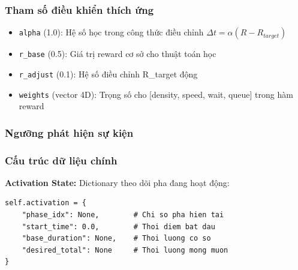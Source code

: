 \documentclass[12pt,a4paper,oneside]{report}
\begin{document}
\subsubsection{Tham số điều khiển thích ứng}
\begin{itemize}
    \item \texttt{alpha} (1.0): Hệ số học trong công thức điều chỉnh $\Delta t = \alpha(R - R_{target})$
    \item \texttt{r\_base} (0.5): Giá trị reward cơ sở cho thuật toán học
    \item \texttt{r\_adjust} (0.1): Hệ số điều chỉnh R\_target động
    \item \texttt{weights} (vector 4D): Trọng số cho [density, speed, wait, queue] trong hàm reward
\end{itemize}

\subsubsection{Ngưỡng phát hiện sự kiện}

\subsubsection{Cấu trúc dữ liệu chính}

\textbf{Activation State:} Dictionary theo dõi pha đang hoạt động:
\begin{lstlisting}[style=py]
self.activation = {
    "phase_idx": None,        # Chi so pha hien tai
    "start_time": 0.0,        # Thoi diem bat dau
    "base_duration": None,    # Thoi luong co so
    "desired_total": None     # Thoi luong mong muon
}
\end{lstlisting}
\end{document}
